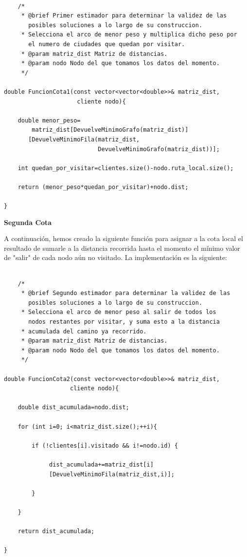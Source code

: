 \documentclass[a4paper,12pt,twoside]{article} %
\begin{document}
\lstset{language=C++}
\begin{lstlisting}

    /*
     * @brief Primer estimador para determinar la validez de las 
       posibles soluciones a lo largo de su construccion.
     * Selecciona el arco de menor peso y multiplica dicho peso por 
       el numero de ciudades que quedan por visitar.
     * @param matriz_dist Matriz de distancias.
     * @param nodo Nodo del que tomamos los datos del momento.
     */

double FuncionCota1(const vector<vector<double>>& matriz_dist,
                     cliente nodo){

    double menor_peso=
        matriz_dist[DevuelveMinimoGrafo(matriz_dist)]
       [DevuelveMinimoFila(matriz_dist,
                           DevuelveMinimoGrafo(matriz_dist))];

    int quedan_por_visitar=clientes.size()-nodo.ruta_local.size();

    return (menor_peso*quedan_por_visitar)+nodo.dist;

}
\end{lstlisting}

\newpage
\textbf{Segunda Cota}

 A continuación, hemos creado la siguiente función para asignar a la cota local el resultado de sumarle a la distancia recorrida hasta el momento el mínimo valor de "salir" de cada nodo aún no visitado. La implementación es la siguiente:
 
\lstset{language=C++}
 \begin{lstlisting}
 
    /*
     * @brief Segundo estimador para determinar la validez de las 
       posibles soluciones a lo largo de su construccion.
     * Selecciona el arco de menor peso al salir de todos los
       nodos restantes por visitar, y suma esto a la distancia
     * acumulada del camino ya recorrido.
     * @param matriz_dist Matriz de distancias.
     * @param nodo Nodo del que tomamos los datos del momento.
     */

double FuncionCota2(const vector<vector<double>>& matriz_dist,
                   cliente nodo){

    double dist_acumulada=nodo.dist;

    for (int i=0; i<matriz_dist.size();++i){

        if (!clientes[i].visitado && i!=nodo.id) {

             dist_acumulada+=matriz_dist[i]
             [DevuelveMinimoFila(matriz_dist,i)];

        }

    }

    return dist_acumulada;

}


\end{lstlisting}
\end{document}
